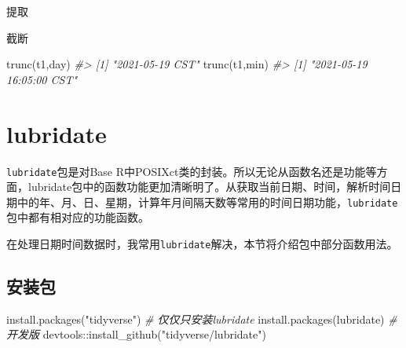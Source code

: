 \documentclass[
]{book}
\newenvironment{Shaded}{\begin{snugshade}}{\end{snugshade}}
\newcommand{\CommentTok}[1]{\textcolor[rgb]{0.56,0.35,0.01}{\textit{#1}}}
\newcommand{\FunctionTok}[1]{\textcolor[rgb]{0.00,0.00,0.00}{#1}}
\newcommand{\NormalTok}[1]{#1}
\newcommand{\SpecialCharTok}[1]{\textcolor[rgb]{0.00,0.00,0.00}{#1}}
\newcommand{\StringTok}[1]{\textcolor[rgb]{0.31,0.60,0.02}{#1}}
\begin{document}
提取

\begin{Shaded}
\end{Shaded}

截断

\begin{Shaded}
\begin{Highlighting}[]
\FunctionTok{trunc}\NormalTok{(t1,}\StringTok{\textquotesingle{}day\textquotesingle{}}\NormalTok{)}
\CommentTok{\#\textgreater{} [1] "2021{-}05{-}19 CST"}
\FunctionTok{trunc}\NormalTok{(t1,}\StringTok{\textquotesingle{}min\textquotesingle{}}\NormalTok{)}
\CommentTok{\#\textgreater{} [1] "2021{-}05{-}19 16:05:00 CST"}
\end{Highlighting}
\end{Shaded}

\hypertarget{lubridate}{%
\section{lubridate}\label{lubridate}}

\texttt{lubridate}包是对Base R中POSIXct类的封装。所以无论从函数名还是功能等方面，lubridate包中的函数功能更加清晰明了。从获取当前日期、时间，解析时间日期中的年、月、日、星期，计算年月间隔天数等常用的时间日期功能，\texttt{lubridate}包中都有相对应的功能函数。

在处理日期时间数据时，我常用\texttt{lubridate}解决，本节将介绍包中部分函数用法。

\hypertarget{lubridate-install}{%
\subsection{安装包}\label{lubridate-install}}

\begin{Shaded}
\begin{Highlighting}[]
\FunctionTok{install.packages}\NormalTok{(}\StringTok{"tidyverse"}\NormalTok{)}
\CommentTok{\# 仅仅只安装lubridate}
\FunctionTok{install.packages}\NormalTok{(}\StringTok{\textquotesingle{}lubridate\textquotesingle{}}\NormalTok{)}
\CommentTok{\# 开发版}
\NormalTok{devtools}\SpecialCharTok{::}\FunctionTok{install\_github}\NormalTok{(}\StringTok{"tidyverse/lubridate"}\NormalTok{)}
\end{Highlighting}
\end{Shaded}
\end{document}
